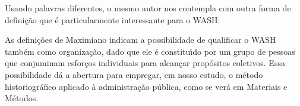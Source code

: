\documentclass[
12pt,		%
openright,	%
twoside,  %
a4paper,			%
chapter=TITLE,		%
english,			%
french,				%
spanish,			%
brazil				%
]{USPSC-classe/USPSC}
\begin{document}
\noindent\begin{center}\mbox{\centering{}}\end{center}


Usando palavras diferentes, o mesmo autor nos contempla com outra forma de defini\c{c}\~ao que \'e particularmente interessante para o WASH:


















\noindent\begin{center}\mbox{\centering{}}\end{center}


As defini\c{c}\~oes de Maximiano indicam a possibilidade de qualificar o WASH tamb\'em como organiza\c{c}\~ao, dado que ele \'e constitu\'{\i}do por um grupo de pessoas que conjuminam esfor\c{c}os individuais para alcan\c{c}ar prop\'ositos coletivos. Essa possibilidade d\'a a abertura para empregar, em nosso estudo, o m\'etodo historiogr\'afico aplicado \`a administra\c{c}\~ao p\'ublica, como se ver\'a em Materiais e M\'etodos.
\end{document}
